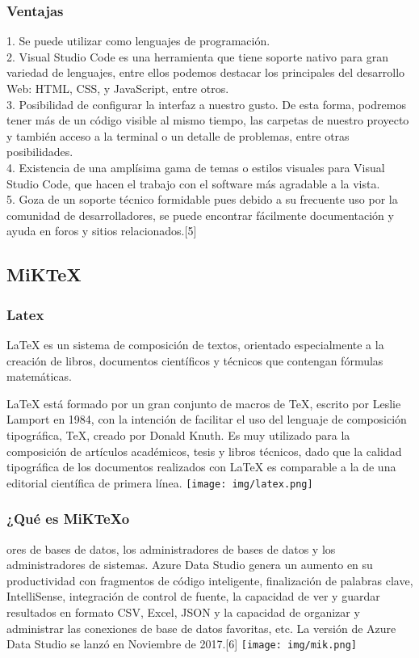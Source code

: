 \documentclass[twocolumn]{article}
\begin{document}
\subsubsection{Ventajas}

  1. Se puede utilizar como lenguajes de programación.\\
  2. Visual Studio Code es una herramienta que tiene soporte nativo para gran variedad de lenguajes, entre ellos podemos destacar los principales del desarrollo Web: HTML, CSS, y JavaScript, entre otros.\\
  3. Posibilidad de configurar la interfaz a nuestro gusto. De esta forma, podremos tener más de un código visible al mismo tiempo, las carpetas de nuestro proyecto y también acceso a la terminal o un detalle de problemas, entre otras posibilidades.\\
  4. Existencia de una amplísima gama de temas o estilos visuales para Visual Studio Code, que hacen el trabajo con el software más agradable a la vista.\\
  5. Goza de un soporte técnico formidable pues debido a su frecuente uso por la comunidad de desarrolladores, se puede encontrar fácilmente documentación y ayuda en foros y sitios relacionados.[5]\\

   
\subsection{MiKTeX}
\subsubsection{Latex}
LaTeX es un sistema de composición de textos, orientado especialmente a la creación de libros, documentos científicos y técnicos que contengan fórmulas matemáticas.

LaTeX está formado por un gran conjunto de macros de TeX, escrito por Leslie Lamport en 1984, con la intención de facilitar el uso del lenguaje de composición tipográfica, TeX, creado por Donald Knuth. Es muy utilizado para la composición de artículos académicos, tesis y libros técnicos, dado que la calidad tipográfica de los documentos realizados con LaTeX es comparable a la de una editorial científica de primera línea.
\texttt{[image: img/latex.png]}

\subsubsection{¿Qué es MiKTeXo}
ores de bases de datos, los administradores de bases de datos y los administradores de sistemas. Azure Data Studio genera un aumento en su productividad con fragmentos de código inteligente, finalización de palabras clave, IntelliSense, integración de control de fuente, la capacidad de ver y guardar resultados en formato CSV, Excel, JSON y la capacidad de organizar y administrar las conexiones de base de datos favoritas, etc. La versión de Azure Data Studio se lanzó en Noviembre de 2017.[6]
\texttt{[image: img/mik.png]}
\end{document}
